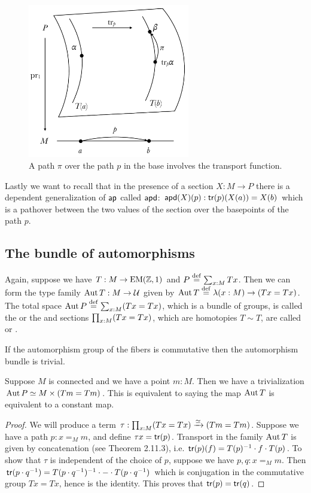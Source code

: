 \begin{figure}[H]
\centering
\includegraphics[width=200pt]{figs/pathovers.pdf}
\caption{A path \( \pi \) over the path \( p \) in the base involves the transport function.}
\label{fig:pathovers}
\end{figure}

Lastly we want to recall that in the presence of a section \( X:M\to P \) there is a dependent generalization of \( \mathsf{ap} \) called \( \mathsf{apd} \): \( \mathsf{apd}(X)(p):\mathsf{tr}(p)(X(a))=X(b) \) which is a pathover between the two values of the section over the basepoints of the path \( p \).

\subsection{The bundle of automorphisms}
\label{sec:automorphisms}
\begin{mydef}
Again, suppose we have \( T:M\to\mathrm{EM}(\mathbb{Z},1) \) and \( P\stackrel{\mathrm{def}}{=}\sum_{x:M}Tx \). Then we can form the type family \( \operatorname{Aut} T:M\to\mathcal{U} \) given by \( \operatorname{Aut} T\stackrel{\mathrm{def}}{=}\lambda(x:M)\to (Tx=Tx) \). The total space \( \operatorname{Aut} P\stackrel{\mathrm{def}}{=}\sum_{x:M}(Tx=Tx) \), which is a bundle of groups, is called the  or the  and sections \( \prod_{x:M}(Tx=Tx) \), which are homotopies \( T\sim T \), are called  or .
\end{mydef}

If the automorphism group of the fibers is commutative then the automorphism bundle is trivial.

\begin{mylemma}
\label{lem:gauge_triv}
Suppose \( M \) is connected and we have a point \( m:M \). Then we have a trivialization \( \operatorname{Aut} P\simeq M\times (Tm=Tm) \). This is equivalent to saying the map \( \operatorname{Aut} T \) is equivalent to a constant map.
\end{mylemma}
\begin{proof}
We will produce a term \( \tau:\prod_{x:M}(Tx=Tx)\xrightarrow[]{\simeq}(Tm=Tm) \). Suppose we have a path \( p:x=_M m \), and define \( \tau x=\mathsf{tr}(p) \). Transport in the family \( \operatorname{Aut} T \) is given by concatenation (see \cite{hottbook} Theorem 2.11.3), i.e. \( \mathsf{tr}(p)(f)=T(p)^{-1}\cdot f\cdot T(p) \). To show that \( \tau \) is independent of the choice of \( p \), suppose we have \( p,q:x=_M m \). Then \( \mathsf{tr}(p\cdot q^{-1})=T(p\cdot q^{-1})^{-1}\cdot -\cdot T(p\cdot q^{-1}) \) which is conjugation in the commutative group \( Tx=Tx \), hence is the identity. This proves that \( \mathsf{tr}(p)=\mathsf{tr}(q) \).
\end{proof}

